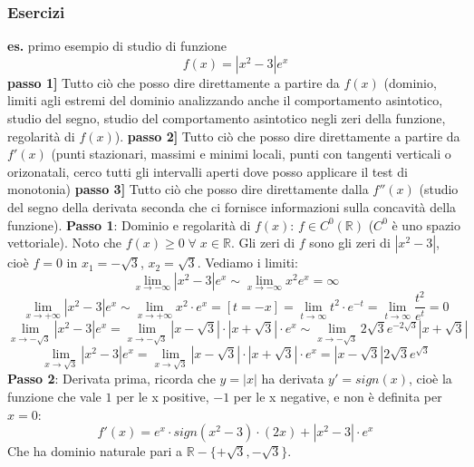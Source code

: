 \subsubsection*{Esercizi}
\textbf{es.} primo esempio di studio di funzione \newline
\[
    f(x) = |x^2-3|e^x
\]
\textbf{passo 1]} Tutto ciò che posso dire direttamente a partire da $f(x)$ (dominio, limiti agli estremi del dominio analizzando anche il comportamento asintotico, studio del segno, studio del comportamento asintotico negli zeri della funzione, regolarità di $f(x)$).\newline
\textbf{passo 2]} Tutto ciò che posso dire direttamente a partire da $f'(x)$ (punti stazionari, massimi e minimi locali, punti con tangenti verticali o orizonatali, cerco tutti gli intervalli aperti dove posso applicare il test di monotonia)\newline
\textbf{passo 3]} Tutto ciò che posso dire direttamente dalla $f''(x)$ (studio del segno della derivata seconda che ci fornisce informazioni sulla concavità della funzione).\newline
\newline
\textbf{Passo 1}: \newline
Dominio e regolarità di $f(x)$: $f \in C^0 (\mathbb{R})$ ($C^0$ è uno spazio vettoriale). Noto che $f(x) \geq 0 \;\forall\; x \in \mathbb{R}$. Gli zeri di $f$ sono gli zeri di $|x^2-3|$, cioè $f=0$ in $x_1 = - \sqrt{3}$, $x_2 = \sqrt{3}$.\newline
Vediamo i limiti:
\[
    \lim_{x\rightarrow -\infty}|x^2-3|e^x \sim \lim_{x\rightarrow -\infty}x^2e^x = \infty
\]
\[
    \lim_{x\rightarrow +\infty}|x^2-3|e^x \sim \lim_{x\rightarrow +\infty}x^2 \cdot e^x = [t = -x] = \lim_{t\rightarrow \infty} t^2 \cdot e^{-t} =  \lim_{t\rightarrow \infty} \frac{t^2}{e^t} = 0
\]
\[
    \lim_{x\rightarrow -\sqrt{3}}|x^2-3|e^x = \lim_{x\rightarrow -\sqrt{3}} |x - \sqrt{3} | \cdot |x + \sqrt{3}| \cdot e^x \sim \lim_{x\rightarrow -\sqrt{3}} 2 \sqrt{3} e ^{-2\sqrt{3}} |x+ \sqrt{3}| 
\]
\[
    \lim_{x\rightarrow \sqrt{3}}|x^2-3|e^x = \lim_{x\rightarrow \sqrt{3}} |x - \sqrt{3} | \cdot |x + \sqrt{3}| \cdot e^x = |x-\sqrt{3}|2 \sqrt{3} e ^{\sqrt{3}}
\]
\textbf{Passo 2}: \newline
Derivata prima, ricorda che $y = |x|$ ha derivata $y' = sign(x)$, cioè la funzione che vale $1$ per le x positive, $-1$ per le x negative, e non è definita per $x=0$:
\[
    f'(x) = e^x \cdot sign(x^2 - 3)\cdot (2x) + |x^2-3| \cdot e^x
\]
Che ha dominio naturale pari a $\mathbb{R} - \{+\sqrt{3}, -\sqrt{3}\}$.\newline
